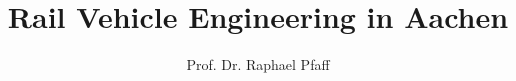 \documentclass[slidestop,compress,mathserif, aspectratio = 169]{beamer}
\begin{document}
\newcommand{\revision}{\today}
\newcommand{\docnum}{\jobname}
\newcommand{\offslide}[2]{\frame{\frametitle{\texttt{[image: Off]} \hspace{.1cm} #1}
\framesubtitle{#2}
\begin{center} \end{center}}}

\title[FHAC Rail Vehicle Engineering]{Rail Vehicle Engineering in Aachen}
\subtitle{}
\author[R. Pfaff]{Prof. Dr. Raphael Pfaff}


\maketitle


\end{document}
